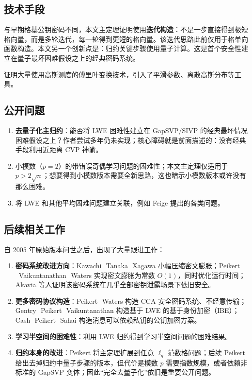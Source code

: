 \documentclass[11pt,a4paper]{article}
\newcommand{\namedash}{\,\textendash\ }
\begin{document}
\subsection{技术手段}

与早期格基公钥密码不同，本文主定理证明使用\textbf{迭代构造}：不是一步直接得到极短格向量，而是多轮迭代，每一轮得到更短的格向量。该迭代思路此前仅用于格单向函数构造。本文另一个创新点是：归约关键步骤使用量子计算。这是首个安全性建立在量子最坏困难假设之上的经典密码系统。

证明大量使用高斯测度的傅里叶变换技术，引入了平滑参数、离散高斯分布等工具。

\subsection{公开问题}

\begin{enumerate}[label=\arabic*.]
  \item \textbf{去量子化主归约}：能否将 LWE 困难性建立在 GapSVP/SIVP 的经典最坏情况困难假设之上？作者尝试多年仍未实现；核心障碍就是前面描述的：没有经典手段利用近距离 CVP 神谕。
  \item 小模数（$p=2$）的带错误奇偶学习问题的困难性；本文主定理仅适用于 $p>2\sqrt{n}$；想要得到小模数版本需要全新思路，这也暗示小模数版本或许没有那么困难。
  \item 将 LWE 和其他平均困难问题建立关联，例如 Feige 提出的各类问题。
\end{enumerate}

\subsection{后续相关工作}

自 2005 年原始版本问世之后，出现了大量跟进工作：

\begin{enumerate}[label=\arabic*.]
  \item \textbf{密码系统改进方向}：Kawachi\namedash Tanaka\namedash Xagawa 小幅压缩密文膨胀；Peikert\namedash Vaikuntanathan\namedash Waters 实现密文膨胀为常数 $O(1)$，同时优化运行时间；Akavia 等人证明该密码系统在几乎全部密钥泄露场景下依旧安全。
  \item \textbf{更多密码协议构造}：Peikert\namedash Waters 构造 CCA 安全密码系统、不经意传输；Gentry\namedash Peikert\namedash Vaikuntanathan 构造基于 LWE 的基于身份加密（IBE）；Cash\namedash Peikert\namedash Sahai 构造消息可以依赖私钥的公钥加密方案。
  \item \textbf{学习半空间的困难性}：利用 LWE 归约得到学习半空间问题的困难结果。
  \item \textbf{归约本身的改进}：Peikert 将主定理扩展到任意 $\ell_{q}$ 范数格问题；后续 Peikert 给出去掉归约中量子步骤的版本，但代价是模数 $p$ 需要指数规模，或者依赖非标准的 GapSVP 变体；因此``完全去量子化''依旧是重要公开问题。
\end{enumerate}
\end{document}
